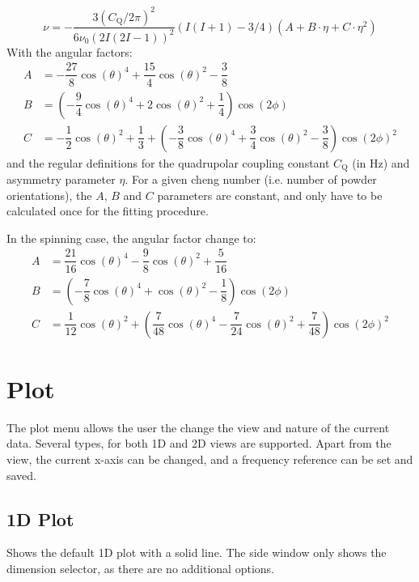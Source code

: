\documentclass[11pt,a4paper]{article}
\begin{document}
\begin{equation}
\nu = -\dfrac{3{(C_\text{Q}/2\pi)}^2}{6\nu_0(2I(2I-1))^2}(I(I+1)-3/4)(A+B\cdot\eta+C\cdot\eta^2)
\end{equation}
With the angular factors:
\begin{align}
A &= -\dfrac{27}{8}\cos(\theta)^4+\dfrac{15}{4}\cos(\theta)^2-\dfrac{3}{8} \\
B &= \left(-\dfrac{9}{4}\cos(\theta)^4+2\cos(\theta)^2+\dfrac{1}{4}\right)\cos(2\phi) \\
C &=-\dfrac{1}{2}\cos(\theta)^2+\dfrac{1}{3}+\left(-\dfrac{3}{8}\cos(\theta)^4+\dfrac{3}{4}\cos(\theta)^2-\dfrac{3}{8}\right)\cos(2\phi)^2
\end{align}
and the regular definitions for the quadrupolar coupling constant $C_\text{Q}$ (in Hz) and asymmetry parameter
$\eta$. For a given cheng number (i.e. number of powder orientations), the $A$, $B$ and $C$ parameters are
constant, and only have to be calculated once for the fitting procedure.

In the spinning case, the angular factor change to:
\begin{align}
A &=  \dfrac{21}{16} \cos(\theta)^4 - \dfrac{9}{8} \cos(\theta)^2 + \dfrac{5}{16}\\
B &=  \left(-\dfrac{7}{8} \cos(\theta)^4 + \cos(\theta)^2 - \dfrac{1}{8}\right) \cos(2 \phi)\\
C &=  \dfrac{1}{12} \cos(\theta)^2 + \left( \dfrac{7}{48} \cos(\theta)^4 - \dfrac{7}{24} \cos(\theta)^2 + \dfrac{7}{48} \right) \cos(2 \phi)^2
\end{align}







\section{Plot}
The plot menu allows the user the change the view and nature of the current data. Several types, for both 1D and 2D views are supported. Apart from the view, the current x-axis can be changed, and a 
frequency reference can be set and saved. 


\subsection{1D Plot}
Shows the default 1D plot with a solid line. The side window only shows the dimension selector, as there are no additional options.
\end{document}
